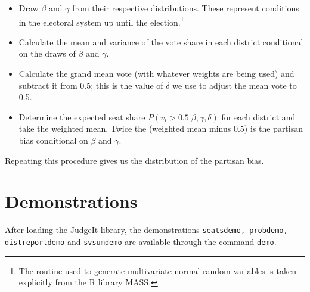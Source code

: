 \documentclass[oneside,letterpaper,titlepage]{article}
\begin{document}
\begin{itemize}

\item Draw $\beta$ and $\gamma$ from their respective distributions. These represent conditions in the electoral system up until the election.\footnote{The routine used to generate multivariate normal random variables is taken explicitly from the R library MASS.}

\item Calculate the mean and variance of the vote share in each district conditional on the draws of $\beta$ and $\gamma$.

\item Calculate the grand mean vote (with whatever weights are being used) and subtract it from 0.5; this is the value of $\delta$ we use to adjust the mean vote to 0.5.

\item Determine the expected seat share $P(v_i>0.5|\beta,\gamma,\delta)$ for each district and take the weighted mean. Twice the (weighted mean minus 0.5) is the partisan bias conditional on $\beta$ and $\gamma$.

\end{itemize}

Repeating this procedure gives us the distribution of the partisan bias.

\section{Demonstrations}

After loading the JudgeIt library, the demonstrations \texttt{seatsdemo, probdemo,
  distreportdemo} and \texttt{svsumdemo} are available through the
command \texttt{demo}.

 \bibsep=0in

\end{document}
